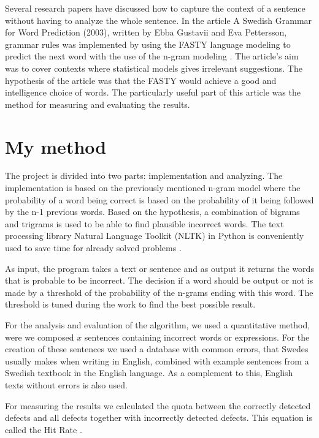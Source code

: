 \documentclass[a4paper,12pt]{article}
\begin{document}
Several research papers have discussed how to capture the context of a sentence without having to analyze the whole sentence. In the article A Swedish Grammar for Word Prediction (2003), written by Ebba Gustavii and Eva Pettersson, grammar rules was implemented by using the FASTY language modeling to predict the next word with the use of the n-gram modeling \cite{gustavii2003a}. The article's aim was to cover contexts where statistical models gives irrelevant suggestions. The hypothesis of the article was that the FASTY would achieve a good and intelligence choice of words. The particularly useful part of this article was the method for measuring and evaluating the results.

\section{My method}
\label{sec:method}
The project is divided into two parts: implementation and analyzing. 
The implementation is based on the previously mentioned n-gram model where the probability of a word being correct is based on the probability of it being followed by the n-1 previous words. Based on the hypothesis, a combination of bigrams and trigrams is used to be able to find plausible incorrect words. The text processing library Natural Language Toolkit (NLTK) in Python is conveniently used to save time for already solved problems \cite{loper2002nltk}. 

As input, the program takes a text or sentence and as output it returns the words that is probable to be incorrect. The decision if a word should be output or not is made by a threshold of the probability of the n-grams ending with this word. The threshold is tuned during the work to find the best possible result. 

For the analysis and evaluation of the algorithm, we used a quantitative method, were we composed $x$ sentences containing incorrect words or expressions. For the creation of these sentences we used a database with common errors, that Swedes usually makes when writing in English, combined with example sentences from a Swedish textbook in the English language. As a complement to this, English texts without errors is also used.

For measuring the results we calculated the quota between the correctly detected defects and all defects together with incorrectly detected defects. This equation is called the Hit Rate \cite{wikipedia2014hitrate, ghayoomi2005word}.
\end{document}
